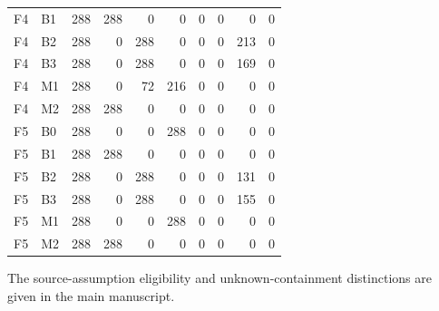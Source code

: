 \documentclass[10pt]{article}
\begin{document}
\begin{center}
\begin{longtable}{llrrrrrrrr}
F4 & B1 & 288 & 288 & 0 & 0 & 0 & 0 & 0 & 0 \\
F4 & B2 & 288 & 0 & 288 & 0 & 0 & 0 & 213 & 0 \\
F4 & B3 & 288 & 0 & 288 & 0 & 0 & 0 & 169 & 0 \\
F4 & M1 & 288 & 0 & 72 & 216 & 0 & 0 & 0 & 0 \\
F4 & M2 & 288 & 288 & 0 & 0 & 0 & 0 & 0 & 0 \\
F5 & B0 & 288 & 0 & 0 & 288 & 0 & 0 & 0 & 0 \\
F5 & B1 & 288 & 288 & 0 & 0 & 0 & 0 & 0 & 0 \\
F5 & B2 & 288 & 0 & 288 & 0 & 0 & 0 & 131 & 0 \\
F5 & B3 & 288 & 0 & 288 & 0 & 0 & 0 & 155 & 0 \\
F5 & M1 & 288 & 0 & 0 & 288 & 0 & 0 & 0 & 0 \\
F5 & M2 & 288 & 288 & 0 & 0 & 0 & 0 & 0 & 0 \\
\bottomrule\end{longtable}\end{center}
\noindent The source-assumption eligibility and unknown-containment distinctions are given in the main manuscript.
\end{document}
